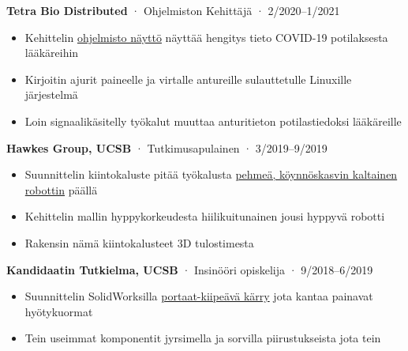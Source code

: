 \documentclass[12pt, oneside]{article}
\newcommand{\jobtitle}[3] {
	{\bf #1} · {#2} · {#3} \vspace{-7pt} \\
}
\begin{document}
\begin{flushleft}
\jobtitle{Tetra Bio Distributed}{Ohjelmiston Kehittäjä}{2/2020–1/2021}
\begin{itemize}
	\item Kehittelin \href{https://github.com/tetrabiodistributed/project-tetra-display}{ohjelmisto näyttö} näyttää hengitys tieto COVID-19 potilaksesta lääkäreihin \\
	\item Kirjoitin ajurit paineelle ja virtalle antureille sulauttetulle Linuxille järjestelmä \\
	\item Loin signaalikäsitelly työkalut muuttaa anturitieton potilastiedoksi lääkäreille \\
\end{itemize}

\jobtitle{Hawkes Group, UCSB}{Tutkimusapulainen}{3/2019–9/2019}
\begin{itemize}
	\item Suunnittelin kiintokaluste pitää työkalusta \href{https://portfolium.com/entry/vine-robot-tool-mount}{pehmeä, köynnöskasvin kaltainen robottin} päällä \\
	\item Kehittelin mallin hyppykorkeudesta hiilikuitunainen jousi hyppyvä robotti \\
	\item Rakensin nämä kiintokalusteet 3D tulostimesta  \\
\end{itemize}

\jobtitle{Kandidaatin Tutkielma, UCSB}{Insinööri opiskelija}{9/2018–6/2019}
\begin{itemize}
	\item Suunnittelin SolidWorksilla \href{https://portfolium.com/entry/automatic-stair-climbing-vehicle}{portaat-kiipeävä kärry} jota kantaa painavat hyötykuormat \\
	\item Tein useimmat komponentit jyrsimella ja sorvilla piirustukseista jota tein \\
\end{itemize}


\end{flushleft}
\end{document}
